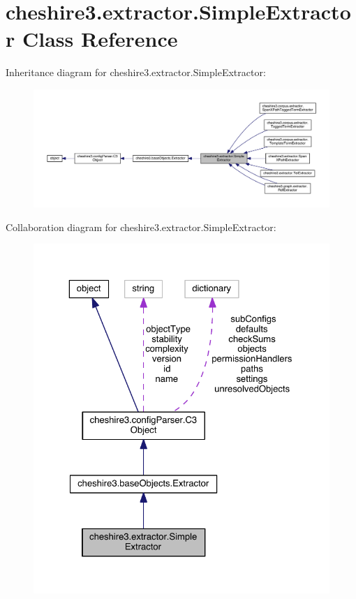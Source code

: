 \hypertarget{classcheshire3_1_1extractor_1_1_simple_extractor}{\section{cheshire3.\-extractor.\-Simple\-Extractor Class Reference}
\label{classcheshire3_1_1extractor_1_1_simple_extractor}
}


Inheritance diagram for cheshire3.\-extractor.\-Simple\-Extractor\-:
\nopagebreak
\begin{figure}[H]
\begin{center}
\leavevmode
\includegraphics[width=350pt]{classcheshire3_1_1extractor_1_1_simple_extractor__inherit__graph}
\end{center}
\end{figure}


Collaboration diagram for cheshire3.\-extractor.\-Simple\-Extractor\-:
\nopagebreak
\begin{figure}[H]
\begin{center}
\leavevmode
\includegraphics[width=325pt]{classcheshire3_1_1extractor_1_1_simple_extractor__coll__graph}
\end{center}
\end{figure}
